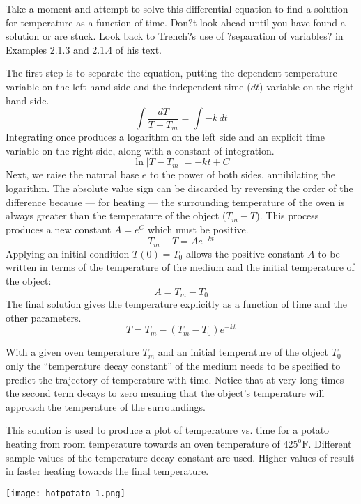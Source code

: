 \documentclass{ximera}
\begin{document}
Take a moment and attempt to solve this differential equation to find a solution for temperature as a function of time.  Don?t look ahead until you have found a solution or are stuck.  Look back to Trench?s use of ?separation of variables? in Examples 2.1.3 and 2.1.4 of his text.
   
The first step is to separate the equation, putting the dependent temperature variable on the left hand side and the independent time ($dt$)  variable on the right hand side.
\[
\int\frac{dT}{T-T_m}=\int -k\,dt
\]
Integrating once produces a logarithm on the left side and an explicit time variable on the right side, along with a constant of integration.
\[
\ln|T-T_m|=-kt+C
\]
Next, we raise the natural base $e$ to the power of both sides, annihilating the logarithm.  The absolute value sign can be discarded by reversing the order of the difference because --- for heating --- the surrounding temperature of the oven is always greater than the temperature of the object ($T_m-T$). This process produces a new constant $A=e^C$ which must be positive.
\[
T_m-T=Ae^{-kt}
\] 
Applying an initial condition $T(0)=T_0$ allows the positive constant $A$ to be written in terms of the temperature of the medium and the initial temperature of the object:
\[
A=T_m-T_0
\]
The final solution gives the temperature explicitly as a function of time and the other parameters.
\[
T=T_m-(T_m-T_0)e^{-kt}
\]

With a given oven temperature $T_m$ and an initial temperature of the object $T_0$ only the ``temperature decay constant'' of the medium  needs to be specified to predict the trajectory of temperature with time.  Notice that at very long times the second term decays to zero meaning that the object's temperature will approach the temperature of the surroundings.

This solution is used to produce a plot of temperature vs. time for a potato heating from room temperature towards an oven temperature of $425^{\text{o}}\text{F}$.  Different sample values of the temperature decay constant  are used.  Higher values of  result in faster heating towards the final temperature.

\begin{image}
\texttt{[image: hotpotato\_1.png]}
\end{image}
\end{document}
